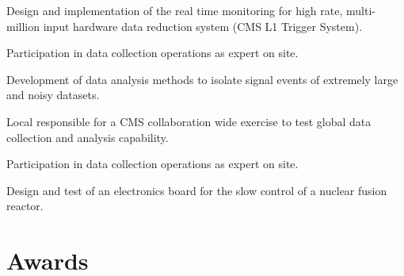 \documentclass[letterpaper]{deedy-resume} %
\begin{document}
\begin{minipage}[t]{0.66\textwidth}
\sectionspace %



\begin{tightitemize}
\item Design and implementation of the real time monitoring for high rate, multi-million input hardware data reduction system (CMS L1 Trigger System).
\item Participation in data collection operations as expert on site.
\end{tightitemize}

\sectionspace %


\begin{tightitemize}
\item Development of data analysis methods to isolate signal events of extremely large and noisy datasets.
\item Local responsible for a CMS collaboration wide exercise to test global data collection and analysis capability.
\item Participation in data collection operations as expert on site.
\end{tightitemize}

\sectionspace %


\begin{tightitemize}
\item  Design and test of an electronics board for the slow control of a nuclear fusion reactor.
\end{tightitemize}

\sectionspace %


\section{Awards} 


\end{minipage}
\end{document}
